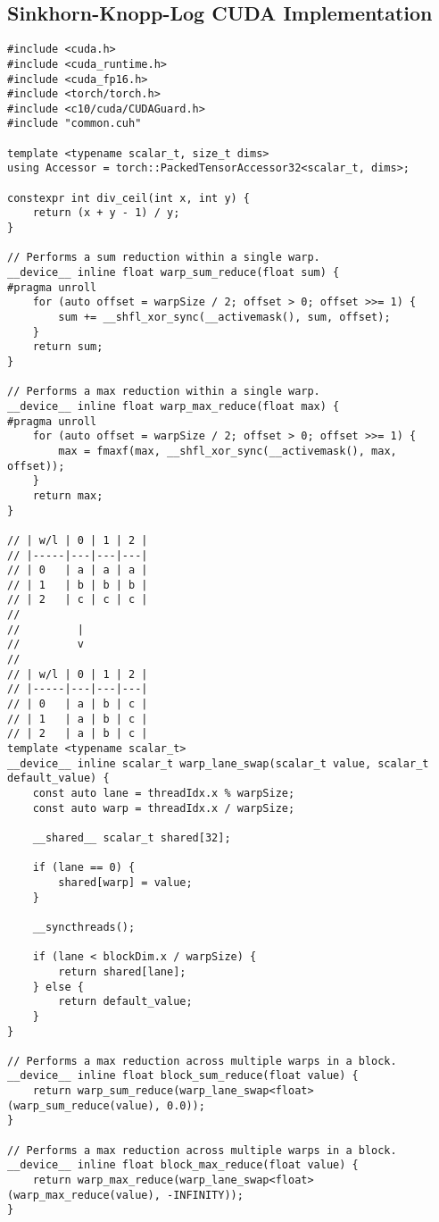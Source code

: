 \subsection{Sinkhorn-Knopp-Log CUDA Implementation}\label{sinkhorn_log_impl}
\begin{lstlisting}
#include <cuda.h>
#include <cuda_runtime.h>
#include <cuda_fp16.h>
#include <torch/torch.h>
#include <c10/cuda/CUDAGuard.h>
#include "common.cuh"

template <typename scalar_t, size_t dims>
using Accessor = torch::PackedTensorAccessor32<scalar_t, dims>;

constexpr int div_ceil(int x, int y) {
    return (x + y - 1) / y;
}

// Performs a sum reduction within a single warp.
__device__ inline float warp_sum_reduce(float sum) {
#pragma unroll
    for (auto offset = warpSize / 2; offset > 0; offset >>= 1) {
        sum += __shfl_xor_sync(__activemask(), sum, offset);
    }
    return sum;
}

// Performs a max reduction within a single warp.
__device__ inline float warp_max_reduce(float max) {
#pragma unroll
    for (auto offset = warpSize / 2; offset > 0; offset >>= 1) {
        max = fmaxf(max, __shfl_xor_sync(__activemask(), max, offset));
    }
    return max;
}

// | w/l | 0 | 1 | 2 |
// |-----|---|---|---|
// | 0   | a | a | a |
// | 1   | b | b | b |
// | 2   | c | c | c |
//
//         |
//         v
//
// | w/l | 0 | 1 | 2 |
// |-----|---|---|---|
// | 0   | a | b | c |
// | 1   | a | b | c |
// | 2   | a | b | c |
template <typename scalar_t>
__device__ inline scalar_t warp_lane_swap(scalar_t value, scalar_t default_value) {
    const auto lane = threadIdx.x % warpSize;
    const auto warp = threadIdx.x / warpSize;

    __shared__ scalar_t shared[32];

    if (lane == 0) {
        shared[warp] = value;
    }

    __syncthreads();

    if (lane < blockDim.x / warpSize) {
        return shared[lane];
    } else {
        return default_value;
    }
}

// Performs a max reduction across multiple warps in a block.
__device__ inline float block_sum_reduce(float value) {
    return warp_sum_reduce(warp_lane_swap<float>(warp_sum_reduce(value), 0.0));
}

// Performs a max reduction across multiple warps in a block.
__device__ inline float block_max_reduce(float value) {
    return warp_max_reduce(warp_lane_swap<float>(warp_max_reduce(value), -INFINITY));
}


\end{lstlisting}

